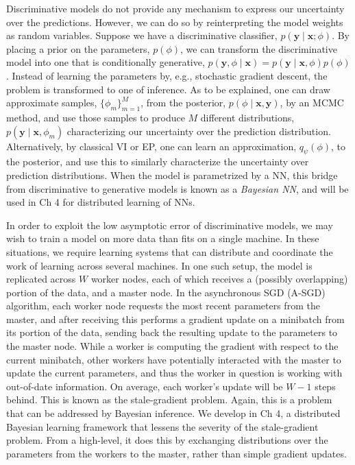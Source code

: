 

Discriminative models do not provide any mechanism to express our uncertainty over the predictions. However, we can do so by reinterpreting the model weights as random variables. Suppose we have a discriminative classifier, $p(\mathbf{y}\mid\mathbf{x};\phi)$. By placing a prior on the parameters, $p(\phi)$, we can transform the discriminative model into one that is conditionally generative, $p(\mathbf{y},\phi\mid\mathbf{x})=p(\mathbf{y}\mid\mathbf{x},\phi)p(\phi)$. Instead of learning the parameters by, e.g., stochastic gradient descent, the problem is transformed to one of inference. As to be explained, one can draw approximate samples, $\{\phi_m\}_{m=1}^M$, from the posterior, $p(\phi\mid\mathbf{x},\mathbf{y})$, by an MCMC method, and use those samples to produce $M$ different distributions, $p(\mathbf{y}\mid\mathbf{x},\phi_m)$ characterizing our uncertainty over the prediction distribution. Alternatively, by classical VI or EP, one can learn an approximation, $q_\psi(\phi)$, to the posterior, and use this to similarly characterize the uncertainty over prediction distributions. When the model is parametrized by a NN, this bridge from discriminative to generative models is known as a \emph{Bayesian NN}, and will be used in Ch 4 for distributed learning of NNs.

In order to exploit the low asymptotic error of discriminative models, we may wish to train a model on more data than fits on a single machine. In these situations, we require learning systems that can distribute and coordinate the work of learning across several machines. In one such setup, the model is replicated across $W$ worker nodes, each of which receives a (possibly overlapping) portion of the data, and a master node. In the asynchronous SGD (A-SGD) \citep{DeanEtAl2012} algorithm, each worker node requests the most recent parameters from the master, and after receiving this performs a gradient update on a minibatch from its portion of the data, sending back the resulting update to the parameters to the master node. While a worker is computing the gradient with respect to the current minibatch, other workers have potentially interacted with the master to update the current parameters, and thus the worker in question is working with out-of-date information. On average, each worker's update will be $W-1$ steps behind. This is known as the stale-gradient problem. Again, this is a problem that can be addressed by Bayesian inference. We develop in Ch 4, a distributed Bayesian learning framework that lessens the severity of the stale-gradient problem. From a high-level, it does this by exchanging distributions over the parameters from the workers to the master, rather than simple gradient updates.

